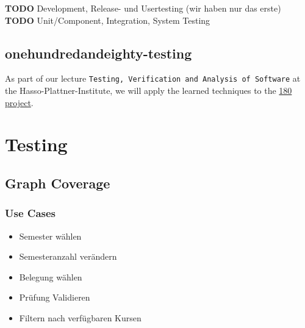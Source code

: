 \documentclass[]{article}
\begin{document}
\textbf{TODO} Development, Release- und Usertesting (wir haben nur das
erste) \textbf{TODO} Unit/Component, Integration, System Testing

\subsection{onehundredandeighty-testing}\label{onehundredandeighty-testing}

As part of our lecture
\texttt{Testing, Verification and Analysis of Software} at the
Hasso-Plattner-Institute, we will apply the learned techniques to the
\href{https://github.com/knub/onehundredandeighty}{180 project}.


\section{Testing}

\subsection{Graph Coverage}
\subsubsection{Use Cases}

\begin{itemize}
\item Semester wählen
\item Semesteranzahl verändern
\item Belegung wählen
\item Prüfung Validieren
\item Filtern nach verfügbaren Kursen
\end{itemize}
\end{document}
